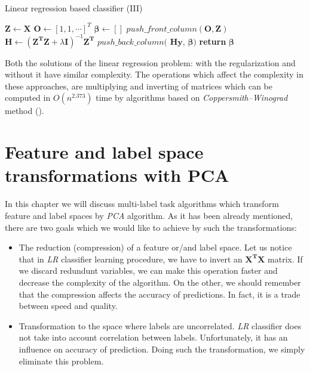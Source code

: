 \begin{algorithm}
    \caption{Linear regression based classifier (III)}\label{alg:LR2}
    \begin{algorithmic}[1]
        \State $\boldsymbol{Z} \gets \boldsymbol{X}$ 
        \State $\boldsymbol{O} \gets [1, 1, \cdots]^T$ 
        \State $\boldsymbol{\beta} \gets []$
        \State $push\_front\_column(\boldsymbol{O}, \boldsymbol{Z})$
        \State $\boldsymbol{H} \gets (\boldsymbol{Z^T}\boldsymbol{Z}+\lambda\boldsymbol{I})^{-1}\boldsymbol{Z^T}$
            \State $push\_back\_column($ $\boldsymbol{H}\boldsymbol{y}$, $\boldsymbol{\beta})$ 
        \EndFor
        \State \textbf{return} $\boldsymbol{\beta}$
    \EndFunction
    \end{algorithmic}
\end{algorithm}

Both the solutions of the linear regression problem: with the regularization and without it have similar complexity. The operations which affect the complexity in these approaches, are multiplying and inverting of matrices which can be computed in $O(n^{2.373})$ time by algorithms based on \textit{Coppersmith–Winograd} method (\cite{VVW}). 

\section{Feature and label space transformations with PCA}

In this chapter we will discuss multi-label task algorithms which transform feature and label spaces by \textit{PCA} algorithm. As it has been already mentioned, there are two goals which we would like to achieve by such the transformations:
\begin{itemize}
    \item The reduction (compression) of a feature or/and label space. Let us notice that in \textit{LR} classifier learning procedure, we have to invert an $\boldsymbol{X^T}\boldsymbol{X}$ matrix. If we discard redundunt variables, we can make this operation faster and decrease the complexity of the algorithm. On the other, we should remember that the compression affects the accuracy of predictions. In fact, it is a trade between speed and quality.
    \item Transformation to the space where labels are uncorrelated. \textit{LR} classifier does not take into account correlation between labels. Unfortunately, it has an influence on accuracy of prediction. Doing such the transformation, we simply eliminate this problem. 
\end{itemize}

